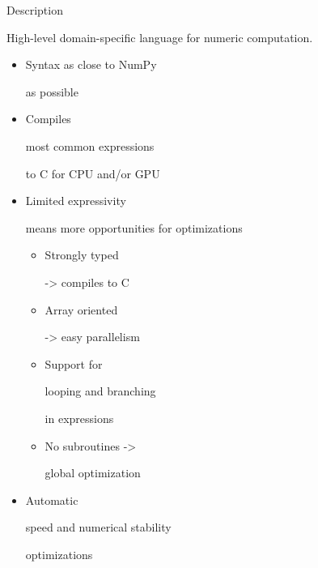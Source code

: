 \documentclass[utf8x,xcolor=pdftex,dvipsnames,table]{beamer}
\begin{document}
\begin{frame}{Description}

  High-level domain-specific language for numeric computation.

  \begin{itemize}
    \item \begin{bf}Syntax as close to NumPy\end{bf} as possible
    \item \begin{bf}Compiles\end{bf} most common expressions \begin{bf}to C for CPU and/or GPU\end{bf}
    \item \begin{bf}Limited expressivity\end{bf} means more opportunities for optimizations
    \begin{itemize}
      \item \begin{bf}Strongly typed\end{bf} -> compiles to C
      \item \begin{bf}Array oriented\end{bf} -> easy parallelism
      \item Support for \begin{bf}looping and branching\end{bf} in expressions
      \item No subroutines -> \begin{bf}global optimization\end{bf}
    \end{itemize}
    \item \begin{bf}Automatic\end{bf} speed and numerical stability \begin{bf}optimizations\end{bf}
  \end{itemize}
\end{frame}
\end{document}
